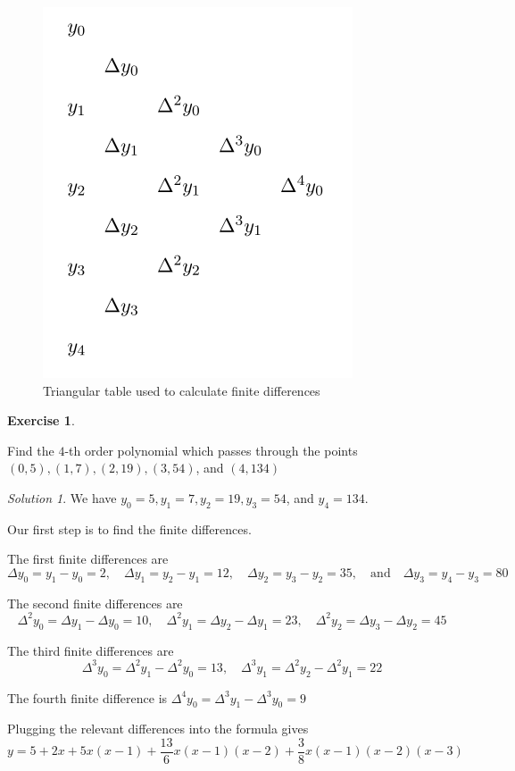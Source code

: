 \documentclass[
]{book}
\theoremstyle{definition}
\theoremstyle{definition}
\theoremstyle{definition}
\newtheorem{exercise}{Exercise}[chapter]
\theoremstyle{definition}
\theoremstyle{remark}
\newtheorem*{solution}{Solution}
\begin{document}
\begin{figure}

{\centering \includegraphics[width=0.4\linewidth]{images/lec-19-fd} 

}

\caption{Triangular table used to calculate finite differences}\label{fig:unnamed-chunk-33}
\end{figure}

\begin{exercise}
\protect\hypertarget{exr:unlabeled-div-144}{}\label{exr:unlabeled-div-144}

Find the \(4\)-th order polynomial which passes through the points \((0,5), (1, 7), (2, 19), (3,54)\), and \((4, 134)\)

\end{exercise}

\begin{solution}

We have \(y_0=5, y_1=7, y_2=19, y_3=54\), and \(y_4=134\).

Our first step is to find the finite differences.

The first finite differences are
\[\Delta y_0=y_1-y_0 = 2, \quad \Delta y_1 = y_2-y_1 = 12, \quad \Delta y_2 = y_3-y_2 = 35,\quad\mbox{and}\quad \Delta y_3 = y_4-y_3=80 \]

The second finite differences are
\[\Delta^2y_0 = \Delta y_1 -\Delta y_0 = 10, \quad \Delta^2y_1 = \Delta y_2 -\Delta y_1 = 23, \quad \Delta^2y_2 = \Delta y_3 -\Delta y_2=45\]

The third finite differences are
\[\Delta^3 y_0 = \Delta^2 y_1-\Delta^2 y_0=13, \quad \Delta^3 y_1 = \Delta^2 y_2- \Delta^2 y_1 = 22\]

The fourth finite difference is \(\Delta^4 y_0 = \Delta^3 y_1 -\Delta ^3 y_0 = 9\)

Plugging the relevant differences into the formula gives \[y=5+2x+5x(x-1)+\frac{13}{6}x(x-1)(x-2)+ \frac{3}{8}x(x-1)(x-2)(x-3)\]

\end{solution}
\end{document}
